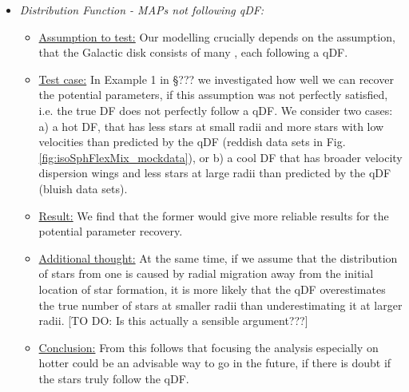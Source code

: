 \begin{itemize}
\begin{itemize}
\item \emph{Distribution Function - MAPs not following qDF:} 
\begin{itemize}
\item \underline{Assumption to test:} Our modelling crucially depends on the assumption, that the Galactic disk consists of many \MAPs, each following a qDF. 
\item \underline{Test case:} In Example 1 in \S ??? we investigated how well we can recover the potential parameters, if this assumption was not perfectly satisfied, i.e. the \MAPs true DF does not perfectly follow a qDF. We consider two cases: a) a hot DF, that has less stars at small radii and more stars with low velocities than predicted by the qDF (reddish data sets in Fig. \ref{fig:isoSphFlexMix_mockdata}), or b) a cool DF that has broader velocity dispersion wings and less stars at large radii than predicted by the qDF (bluish data sets). 
\item \underline{Result:} We find that the former would give more reliable results for the potential parameter recovery.
\item \underline{Additional thought:} At the same time, if we assume that the distribution of stars from one \MAP is caused by radial migration away from the initial location of star formation, it is more likely that the qDF overestimates the true number of stars at smaller radii than underestimating it at larger radii. [TO DO: Is this actually a sensible argument???] 
\item \underline{Conclusion:} From this follows that focusing the analysis especially on hotter \MAPs could be an advisable way to go in the future, if there is doubt if the stars truly follow the qDF.
\end{itemize}


\end{itemize}
\end{itemize}
